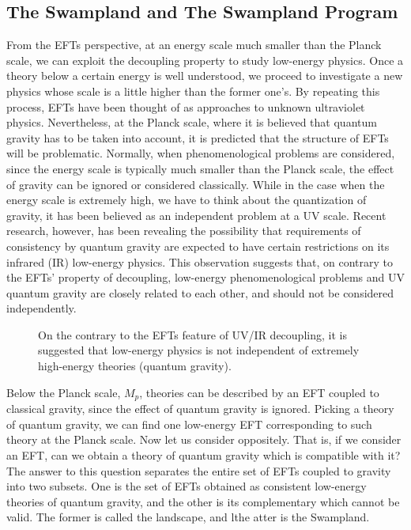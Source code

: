 \subsection{The Swampland and The Swampland Program}
From the EFTs perspective, at an energy scale much smaller than the Planck scale, we can exploit the decoupling property to study low-energy physics. Once a theory below a certain energy is well understood, we proceed to investigate a new physics whose scale is a little higher than the former one's. By repeating this process, EFTs have been thought of as approaches to unknown ultraviolet physics. Nevertheless, at the Planck scale, where it is believed that quantum gravity has to be taken into account, it is predicted that the structure of EFTs will be problematic. Normally, when phenomenological problems are considered, since the energy scale is typically much smaller than the Planck scale, the effect of gravity can be ignored or considered classically. While in the case when the energy scale is extremely high, we have to think about the quantization of gravity, it has been believed as an independent problem at a UV scale. Recent research, however, has been revealing the possibility that requirements of consistency by quantum gravity are expected to have certain restrictions on its infrared (IR) low-energy physics. This observation suggests that, on contrary to the EFTs' property of decoupling, low-energy phenomenological problems and UV quantum gravity are closely related to each other, and should not be considered independently.
\begin{figure}[h]
    \centering
    \caption{On the contrary to the EFTs feature of UV/IR decoupling, it is suggested that low-energy physics is not independent of extremely high-energy theories (quantum gravity).}
    \label{fig:UV/IR mixing}
\end{figure}
Below the Planck scale, $M_{p}$, theories can be described by an EFT coupled to classical gravity, since the effect of quantum gravity is ignored. Picking a theory of quantum gravity, we can find one low-energy EFT corresponding to such theory at the Planck scale. Now let us consider oppositely. That is, if we consider an EFT, can we obtain a theory of quantum gravity which is compatible with it? The answer to this question separates the entire set of EFTs coupled to gravity into two subsets. One is the set of EFTs obtained as consistent low-energy theories of quantum gravity, and the other is its complementary which cannot be valid. The former is called the landscape, and lthe atter is the Swampland.

